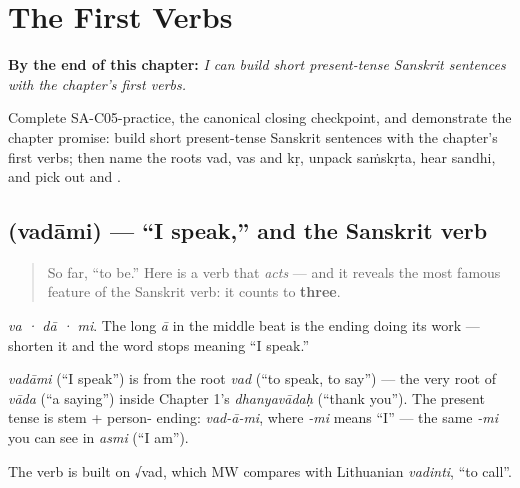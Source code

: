 
\chapter{The First Verbs}
\label{ch:first-verbs}

\begin{chapteropening}
\textbf{By the end of this chapter:} \emph{I can build short present-tense Sanskrit sentences with the chapter's first verbs.}

Complete SA-C05-practice, the canonical closing checkpoint, and demonstrate the chapter promise: build short present-tense Sanskrit sentences with the chapter's first verbs; then name the roots vad, vas and kṛ, unpack saṁskṛta, hear sandhi, and pick out  and .
\end{chapteropening}

\section[\texorpdfstring{\sk{वदामि} (vadāmi)}{वदामि (vadāmi)}]{ (vadāmi) — \textquotedblleft{}I speak,\textquotedblright{} and the Sanskrit verb}

\label{lesson:SA-C05-vadami}



\begin{quote}
So far, \textquotedblleft{}to be.\textquotedblright{} Here is a verb that \emph{acts} — and it reveals the most famous feature of the Sanskrit verb: it counts to \textbf{three}.
\end{quote}

\begin{sounds}
\emph{va · dā · mi}. The long \emph{ā} in the middle beat is the ending doing its work — shorten it and the word stops meaning \textquotedblleft{}I speak.\textquotedblright{}
\end{sounds}

\begin{cousinweb}
\emph{vadāmi} (\textquotedblleft{}I speak\textquotedblright{}) is from the root \emph{vad} (\textquotedblleft{}to speak, to say\textquotedblright{}) — the very root of \emph{vāda} (\textquotedblleft{}a saying\textquotedblright{}) inside Chapter 1's \emph{dhanyavādaḥ} (\textquotedblleft{}thank you\textquotedblright{}). The present tense is stem + person- ending: \emph{vad-ā-mi}, where \emph{-mi} means \textquotedblleft{}I\textquotedblright{} — the same \emph{-mi} you can see in \emph{asmi} (\textquotedblleft{}I am\textquotedblright{}).

The verb is built on √vad, which MW compares with Lithuanian \emph{vadinti}, \textquotedblleft{}to call\textquotedblright{}.
\end{cousinweb}

